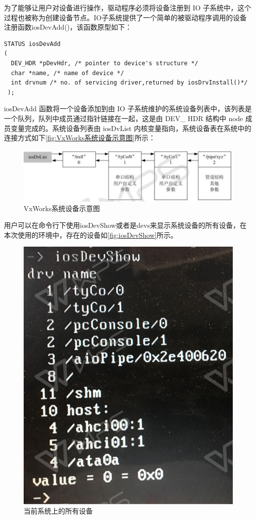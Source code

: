 	为了能够让用户对设备进行操作，驱动程序必须将设备注册到 IO 子系统中，这个过程也被称为创建设备节点。IO子系统提供了一个简单的被驱动程序调用的设备注册函数iosDevAdd()，该函数原型如下：
\lstset{language=C}
\begin{lstlisting}
STATUS iosDevAdd 
( 
  DEV_HDR *pDevHdr, /* pointer to device's structure */ 
  char *name, /* name of device */ 
  int drvnum /* no. of servicing driver,returned by iosDrvInstall()*/
 ); 
\end{lstlisting}

iosDevAdd 函数将一个设备添加到由 IO 子系统维护的系统设备列表中，该列表是一个队列，队列中成员通过指针链接在一起，这是由 DEV\_ HDR 结构中 node 成员变量完成的。系统设备列表由 iosDvList 内核变量指向，系统设备表在系统中的连接方式如下\autoref{fig:VxWorks系统设备示意图}所示：

\begin{figure}[!h]
\centering
\includegraphics[width=1.0\textwidth]{./graphics/vxworks-device-link.pdf}
\caption{VxWorks系统设备示意图}\label{fig:VxWorks系统设备示意图}
\end{figure}

用户可以在命令行下使用iosDevShow或者是devs来显示系统设备的所有设备，在本次使用的环境中，存在的设备如\autoref{fig:iosDevShow}所示。
\begin{figure}[!h]
\centering
\includegraphics[width=.5\textwidth]{./graphics/iosDevShow.pdf}
\caption{当前系统上的所有设备}\label{fig:iosDevShow}
\end{figure}

